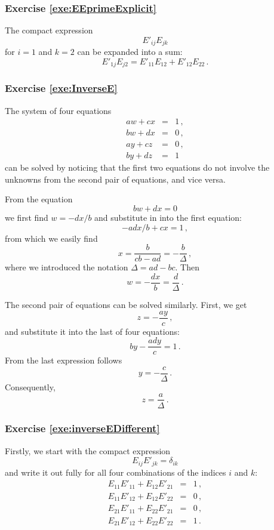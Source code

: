 \subsubsection*{Exercise \ref{exe:EEprimeExplicit}}
The compact expression
\[
E'_{ij}E_{jk}
\]
for $i=1$ and $k=2$ can be expanded into a sum:
\[
E'_{1j}E_{j2} = E'_{11}E_{12}+E'_{12}E_{22}\,.
\]

\subsubsection*{Exercise \ref{exe:InverseE}}
The system of four equations
\begin{eqnarray}
  aw + cx & = & 1\,,\\
  bw + dx & = & 0\,,\\
  ay + cz & = & 0\,,\\
  by + dz & = & 1
\end{eqnarray}
can be solved by noticing that the first two equations do not involve
the unknowns from the second pair of equations, and vice versa.

From the equation
\[
bw + dx =  0
\]
we first find $w = -dx/b$ and substitute in into the first equation:
\[
-adx/b + cx = 1\,,
\]
from which we easily find
\[
x = \frac{b}{cb-ad} = -\frac{b}{\Delta}\,,
\]
where we introduced the notation $\Delta = ad-bc$.
Then
\[
w = -\frac{dx}{b} = \frac{d}{\Delta}\,.
\]

The second pair of equations can be solved similarly. First, we get
\[
z = -\frac{ay}{c}\,,
\]
and substitute it into the last of four equations:
\[
by -\frac{ady}{c} = 1\,.
\]
From the last expression follows
\[
y = -\frac{c}{\Delta}\,.
\]
Consequently,
\[
z = \frac{a}{\Delta}\,.
\]

\subsubsection*{Exercise \ref{exe:inverseEDifferent}}
Firstly, we start with the compact expression
\[
E_{ij}E'_{jk} = \delta_{ik}
\]
and write it out fully for all four combinations of the indices $i$
and $k$:
\begin{eqnarray*}
  E_{11}E'_{11} + E_{12}E'_{21} & = & 1\,,\\
  E_{11}E'_{12} + E_{12}E'_{22} & = & 0\,,\\
  E_{21}E'_{11} + E_{22}E'_{21} & = & 0\,,\\
  E_{21}E'_{12} + E_{22}E'_{22} & = & 1\,.
\end{eqnarray*}

